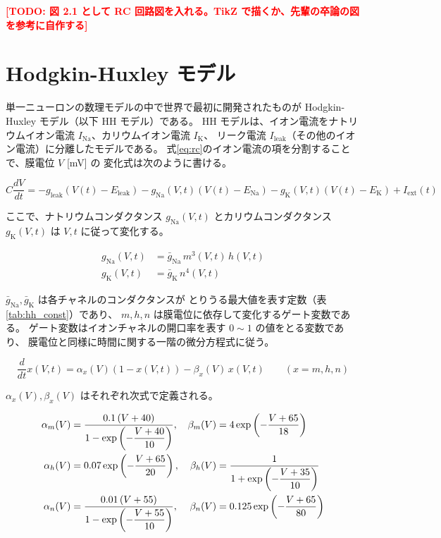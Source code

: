 \documentclass[a4paper,11pt,openany]{ltjsreport}
\newcommand{\TODO}[1]{\textcolor{red}{\textbf{[TODO: #1]}}}
\newcommand{\Iext}{I_{\mathrm{ext}}}
\newcommand{\gleak}{g_{\mathrm{leak}}}
\newcommand{\gNa}{g_{\mathrm{Na}}}
\newcommand{\gK}{g_{\mathrm{K}}}
\newcommand{\ENa}{E_{\mathrm{Na}}}
\newcommand{\EK}{E_{\mathrm{K}}}
\newcommand{\Eleak}{E_{\mathrm{leak}}}
\newcommand{\Ileak}{I_{\mathrm{leak}}}
\newcommand{\INa}{I_{\mathrm{Na}}}
\newcommand{\IK}{I_{\mathrm{K}}}
\begin{document}
\TODO{図 2.1 として RC 回路図を入れる。TikZ で描くか、先輩の卒論の図を参考に自作する}

\section{Hodgkin-Huxley モデル}
\label{sec:hh}

単一ニューロンの数理モデルの中で世界で最初に開発されたものが
Hodgkin-Huxley モデル（以下 HH モデル）である\cite{hodgkin1952}。
HH モデルは、イオン電流をナトリウムイオン電流 $\INa$、カリウムイオン電流 $\IK$、
リーク電流 $\Ileak$（その他のイオン電流）に分離したモデルである。
式\eqref{eq:rc}のイオン電流の項を分割することで、膜電位 $V$ [\si{mV}] の
変化式は次のように書ける。

\begin{equation}
  C\frac{dV}{dt} = -\gleak\left(V(t)-\Eleak\right)
                   -\gNa(V,t)\left(V(t)-\ENa\right)
                   -\gK(V,t)\left(V(t)-\EK\right) + \Iext(t)
  \label{eq:hh_v}
\end{equation}

ここで、ナトリウムコンダクタンス $\gNa(V,t)$ とカリウムコンダクタンス $\gK(V,t)$ は
$V, t$ に従って変化する。

\begin{align}
  \gNa(V,t) &= \bar{g}_{\mathrm{Na}}\, m^3(V,t)\, h(V,t) \label{eq:gna}\\
  \gK(V,t)  &= \bar{g}_{\mathrm{K}}\, n^4(V,t)           \label{eq:gk}
\end{align}

$\bar{g}_{\mathrm{Na}}, \bar{g}_{\mathrm{K}}$ は各チャネルのコンダクタンスが
とりうる最大値を表す定数（表\ref{tab:hh_const}）であり、
$m, h, n$ は膜電位に依存して変化するゲート変数である。
ゲート変数はイオンチャネルの開口率を表す $0 \sim 1$ の値をとる変数であり、
膜電位と同様に時間に関する一階の微分方程式に従う。

\begin{equation}
  \frac{d}{dt}x(V,t) = \alpha_x(V)\left(1 - x(V,t)\right) - \beta_x(V)\, x(V,t)
  \qquad (x = m, h, n)
  \label{eq:hh_gate}
\end{equation}

$\alpha_x(V), \beta_x(V)$ はそれぞれ次式で定義される。

\begin{align}
  \alpha_m(V) &= \frac{0.1\,(V + 40)}{1 - \exp\left(-\dfrac{V + 40}{10}\right)}, &
  \beta_m(V)  &= 4\exp\left(-\frac{V + 65}{18}\right) \notag\\
  \alpha_h(V) &= 0.07\exp\left(-\frac{V + 65}{20}\right), &
  \beta_h(V)  &= \frac{1}{1 + \exp\left(-\dfrac{V + 35}{10}\right)} \label{eq:rate}\\
  \alpha_n(V) &= \frac{0.01\,(V + 55)}{1 - \exp\left(-\dfrac{V + 55}{10}\right)}, &
  \beta_n(V)  &= 0.125\exp\left(-\frac{V + 65}{80}\right) \notag
\end{align}
\end{document}
